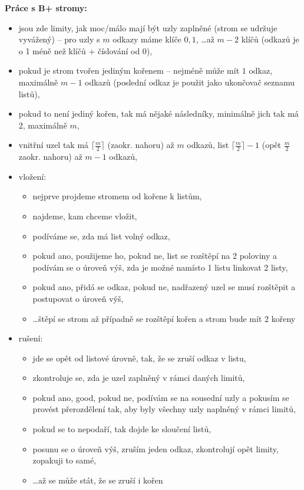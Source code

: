 \documentclass[a4paper, 11pt]{article}
\begin{document}
\textbf{Práce s B+ stromy:}
\begin{itemize}
    \item jsou zde limity, jak moc/málo mají být uzly zaplněné (strom se udržuje vyvážený) -- pro uzly s $m$ odkazy máme klíče $0, 1$, \ldots až $m - 2$ klíčů (odkazů je o 1 méně než klíčů + číslování od 0), 
    \item pokud je strom tvořen jediným kořenem -- nejméně může mít $1$ odkaz, maximálně $m - 1$ odkazů (poslední odkaz je použit jako ukončovač seznamu listů),
    \item pokud to není jediný kořen, tak má nějaké následníky, minimálně jich tak má $2$, maximálně $m$,
    \item vnitřní uzel tak má $\lceil\frac{m}{2}\rceil$ (zaokr. nahoru) až $m$ odkazů, list $\lceil\frac{m}{2}\rceil - 1$ (opět $\frac{m}{2}$ zaokr. nahoru) až $m - 1$ odkazů,
    \item vložení:
    \begin{itemize}
        \item nejprve projdeme stromem od kořene k listům,
        \item najdeme, kam chceme vložit,
        \item podíváme se, zda má list volný odkaz,
        \item pokud ano, použijeme ho, pokud ne, list se rozštěpí na 2 poloviny a podívám se o úroveň výš, zda je možné namísto 1 listu linkovat 2 listy,
        \item pokud ano, přidá se odkaz, pokud ne, nadřazený uzel se musí rozštěpit a postupovat o úroveň výš,
        \item \ldots štěpí se strom až případně se rozštěpí kořen a strom bude mít 2 kořeny
    \end{itemize}
    \item rušení:
    \begin{itemize}
        \item jde se opět od listové úrovně, tak, že se zruší odkaz v listu,
        \item zkontroluje se, zda je uzel zaplněný v rámci daných limitů,
        \item pokud ano, good, pokud ne, podívám se na sousední uzly a pokusím se provést přerozdělení tak, aby byly všechny uzly naplněný v rámci limitů,
        \item pokud se to nepodaří, tak dojde ke sloučení listů,
        \item posunu se o úroveň výš, zruším jeden odkaz, zkontrolují opět limity, zopakuji to samé,
        \item \ldots až se může stát, že se zruší i kořen
    \end{itemize}
\end{itemize}
\end{document}
